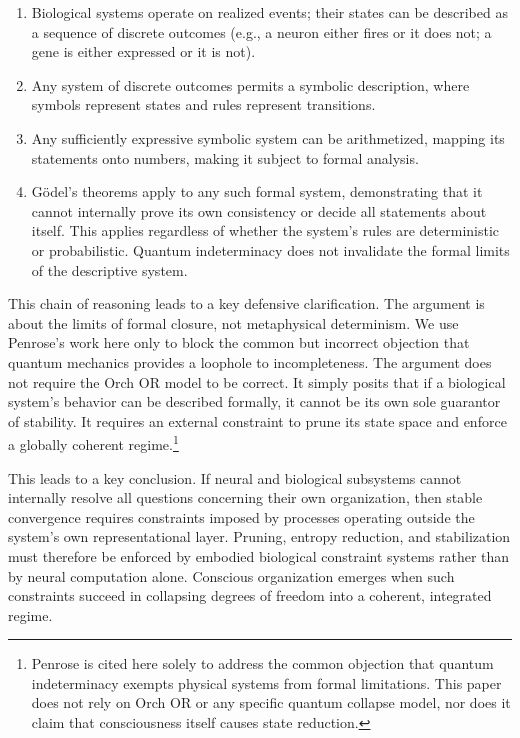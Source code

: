 \documentclass[12pt,letterpaper]{article}
\begin{document}
\begin{enumerate}
    \item Biological systems operate on realized events; their states can be described as a sequence of discrete outcomes (e.g., a neuron either fires or it does not; a gene is either expressed or it is not). 
    \item Any system of discrete outcomes permits a symbolic description, where symbols represent states and rules represent transitions.
    \item Any sufficiently expressive symbolic system can be arithmetized, mapping its statements onto numbers, making it subject to formal analysis.
    \item Gödel's theorems apply to any such formal system, demonstrating that it cannot internally prove its own consistency or decide all statements about itself. This applies regardless of whether the system's rules are deterministic or probabilistic. Quantum indeterminacy does not invalidate the formal limits of the descriptive system.
\end{enumerate}

This chain of reasoning leads to a key defensive clarification. The argument is about the limits of formal closure, not metaphysical determinism. We use Penrose's work here only to block the common but incorrect objection that quantum mechanics provides a loophole to incompleteness. The argument does not require the Orch OR model to be correct. It simply posits that if a biological system's behavior can be described formally, it cannot be its own sole guarantor of stability. It requires an external constraint to prune its state space and enforce a globally coherent regime.\footnote{Penrose is cited here solely to address the common objection that quantum indeterminacy exempts physical systems from formal limitations. This paper does not rely on Orch OR or any specific quantum collapse model, nor does it claim that consciousness itself causes state reduction.}

This leads to a key conclusion. If neural and biological subsystems cannot internally resolve all questions concerning their own organization, then stable convergence requires constraints imposed by processes operating outside the system's own representational layer. Pruning, entropy reduction, and stabilization must therefore be enforced by embodied biological constraint systems rather than by neural computation alone. Conscious organization emerges when such constraints succeed in collapsing degrees of freedom into a coherent, integrated regime.
\end{document}
